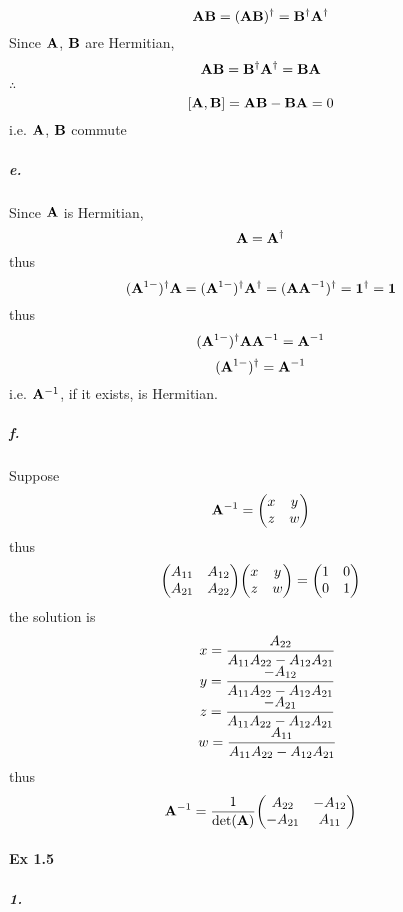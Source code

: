 \documentclass[a4paper]{article}
\newcommand{\ex}[1]{\paragraph{Ex #1}}
\newcommand{\subex}[1]{\subparagraph{#1}}
\newcommand{\iden}{{\large \bm{1}}}
\numberwithin{equation}{section}
\begin{document}
\begin{equation}\label{key}
\vb{A}\vb{B} = (\vb{A}\vb{B})^\dagger = \vb{B}^\dagger \vb{A}^\dagger
\end{equation}
Since $ \vb{A} $, $ \vb{B} $ are Hermitian,
\begin{equation}\label{key}
\vb{A}\vb{B} = \vb{B}^\dagger \vb{A}^\dagger = \vb{B}\vb{A}
\end{equation}
$ \therefore $
\begin{equation}\label{key}
[\vb{A}, \vb{B}] = \vb{A}\vb{B} - \vb{B}\vb{A} = 0
\end{equation}
i.e. $ \vb{A} $, $ \vb{B} $ commute
\subex{e.}
Since $ \vb{A} $ is Hermitian,
\begin{equation}\label{key}
\vb{A} = \vb{A}^\dagger
\end{equation}
thus
\begin{equation}\label{key}
(\vb{A}^{1-})^\dagger \vb{A} = (\vb{A}^{1-})^\dagger \vb{A}^\dagger = (\vb{A}\vb{A}^{-1})^\dagger = \iden^\dagger = \iden
\end{equation}
thus
\begin{equation}\label{key}
(\vb{A}^{1-})^\dagger \vb{A} \vb{A}^{-1} = \vb{A}^{-1}
\end{equation}
\begin{equation}\label{key}
(\vb{A}^{1-})^\dagger = \vb{A}^{-1}
\end{equation}
i.e. $ \vb{A}^{-1} $, if it exists, is Hermitian.
\subex{f.}
Suppose
\begin{equation}\label{key}
\vb{A}^{-1} = \mqty(x & y\\z & w)
\end{equation}
thus
\begin{equation}\label{key}
\mqty(A_{11} & A_{12}\\A_{21} & A_{22})\mqty(x & y\\z & w) = \mqty(1 & 0\\0 & 1)
\end{equation}
the solution is
\begin{equation}\label{key}
\mqty{
	&x = \dfrac{A_{22}}{A_{11}A_{22} - A_{12}A_{21}}\\
	&y = \dfrac{-A_{12}}{A_{11}A_{22} - A_{12}A_{21}}\\
	&z = \dfrac{-A_{21}}{A_{11}A_{22} - A_{12}A_{21}}\\
	&w = \dfrac{A_{11}}{A_{11}A_{22} - A_{12}A_{21}}\\ 
}
\end{equation}
thus
\begin{equation}\label{key}
\vb{A}^{-1} = \dfrac{1}{\det(\vb{A})} \mqty(A_{22} & -A_{12}\\ -A_{21} & A_{11})
\end{equation}

\ex{1.5}
\subex{1.}
\end{document}

